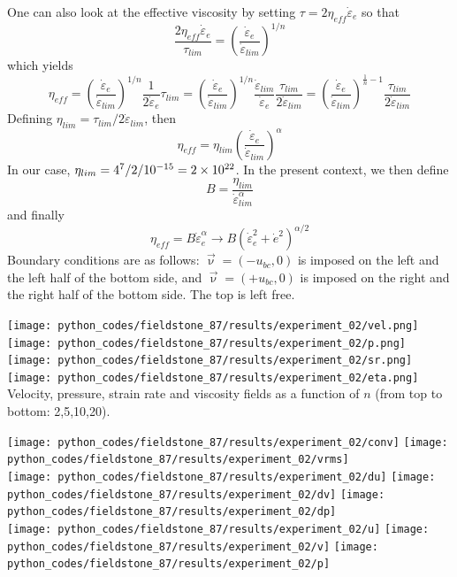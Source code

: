 One can also look at the effective viscosity by 
setting $\tau = 2 \eta_{eff} \dot{\varepsilon}_e$ so that
\[
\frac{2 \eta_{eff}\dot{\varepsilon}_e }{\tau_{lim}} = 
\left( \frac{ \dot{\varepsilon}_e  }{ \dot{\varepsilon}_{lim}  }  \right)^{1/n}
\]
which yields
\[
\eta_{eff} = \left( \frac{ \dot{\varepsilon}_e  }{ \dot{\varepsilon}_{lim} } \right)^{1/n}   
\frac{1}{ 2\dot{\varepsilon}_e} \tau_{lim}
=
\left( \frac{ \dot{\varepsilon}_e  }{ \dot{\varepsilon}_{lim}  }  \right)^{1/n} 
\frac{\dot{\varepsilon}_{lim} }{\dot{\varepsilon}_e} \frac{\tau_{lim}   }{2 \dot{\varepsilon}_{lim}} 
=
\left( \frac{ \dot{\varepsilon}_e  }{ \dot{\varepsilon}_{lim}  }  \right)^{\frac{1}{n}-1}  
\frac{\tau_{lim}   }{2 \dot{\varepsilon}_{lim}} 
\]
Defining $\eta_{lim}=\tau_{lim} /  2 \dot{\varepsilon}_{lim}$, then
\[
\eta_{eff} = \eta_{lim} \left( \frac{ \dot{\varepsilon}_e  }{ \dot{\varepsilon}_{lim}  }  
\right)^{\alpha}
\]
In our case, $\eta_{lim}= 4\time 10^7/2/10^{-15}=2\times10^{22}$. 
In the present context, we then define
\[
B
= \frac{ \eta_{lim} }{\dot{\varepsilon}_{lim}^{\alpha}}
\]
and finally 
\[
\eta_{eff} = B \dot{\varepsilon}_e^\alpha \rightarrow B (\dot{\varepsilon}_e^2 + \dot{e}^2 )^{\alpha/2}
\]
Boundary conditions are as follows: $\vec{\upnu}=(-u_{bc},0)$ is imposed on the left and the left half 
of the bottom side, and $\vec{\upnu}=(+u_{bc},0)$ is imposed on the right and the right half
of the bottom side. The top is left free.  

\begin{center}
\texttt{[image: python\_codes/fieldstone\_87/results/experiment\_02/vel.png]}
\texttt{[image: python\_codes/fieldstone\_87/results/experiment\_02/p.png]}\\
\texttt{[image: python\_codes/fieldstone\_87/results/experiment\_02/sr.png]}
\texttt{[image: python\_codes/fieldstone\_87/results/experiment\_02/eta.png]}\\
{\captionfont Velocity, pressure, strain rate and viscosity fields as a function 
of $n$ (from top to bottom: 2,5,10,20).} 
\end{center}

\begin{center}
\texttt{[image: python\_codes/fieldstone\_87/results/experiment\_02/conv]}
\texttt{[image: python\_codes/fieldstone\_87/results/experiment\_02/vrms]}\\
\texttt{[image: python\_codes/fieldstone\_87/results/experiment\_02/du]}
\texttt{[image: python\_codes/fieldstone\_87/results/experiment\_02/dv]}
\texttt{[image: python\_codes/fieldstone\_87/results/experiment\_02/dp]}\\
\texttt{[image: python\_codes/fieldstone\_87/results/experiment\_02/u]}
\texttt{[image: python\_codes/fieldstone\_87/results/experiment\_02/v]}
\texttt{[image: python\_codes/fieldstone\_87/results/experiment\_02/p]}\\
\end{center}

